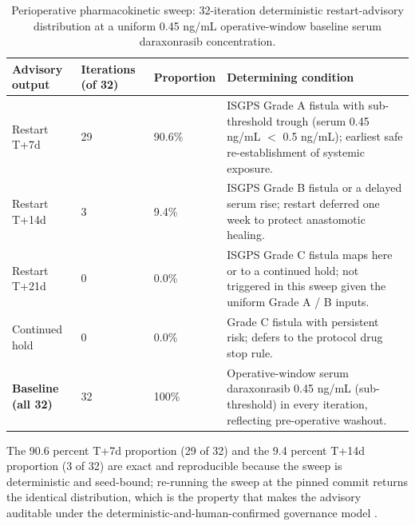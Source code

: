 \clearpage

\begin{table}[t]
\centering
\caption{Perioperative pharmacokinetic sweep: 32-iteration deterministic
restart-advisory distribution at a uniform 0.45 ng/mL operative-window baseline
serum daraxonrasib concentration.}
\label{tab:sec07-pk}
\begin{tabularx}{\textwidth}{L{2.5cm} L{1.9cm} L{2.0cm} Y}
\toprule
\textbf{Advisory output} & \textbf{Iterations (of 32)} & \textbf{Proportion} & \textbf{Determining condition} \\
\midrule
Restart T+7d & 29 & 90.6\% & ISGPS Grade A fistula with sub-threshold trough (serum 0.45 ng/mL $<$ 0.5 ng/mL); earliest safe re-establishment of systemic exposure. \\
Restart T+14d & 3 & 9.4\% & ISGPS Grade B fistula or a delayed serum rise; restart deferred one week to protect anastomotic healing. \\
Restart T+21d & 0 & 0.0\% & ISGPS Grade C fistula maps here or to a continued hold; not triggered in this sweep given the uniform Grade A / B inputs. \\
Continued hold & 0 & 0.0\% & Grade C fistula with persistent risk; defers to the protocol drug stop rule. \\
\midrule
\textbf{Baseline (all 32)} & 32 & 100\% & Operative-window serum daraxonrasib 0.45 ng/mL (sub-threshold) in every iteration, reflecting pre-operative washout. \\
\bottomrule
\end{tabularx}
\end{table}
\vspace*{-1.35cm}

The 90.6 percent T+7d proportion (29 of 32) and the 9.4 percent
T+14d proportion (3 of 32) are exact and reproducible because the sweep is
deterministic and seed-bound; re-running the sweep at the pinned commit returns
the identical distribution, which is the property that makes the advisory
auditable under the deterministic-and-human-confirmed governance model
\cite{onpremwhippl,clintrustpai}.



